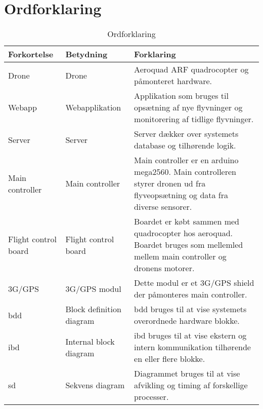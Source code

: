 \section{Ordforklaring}
\begin{table}[H]
	\centering
		\begin{tabular}{|p{2.6cm}|p{4.5 cm}|p{6.5 cm}|} 
		\hline
			\textbf{Forkortelse} & \textbf{Betydning} & \textbf{Forklaring} \\ \hline
			 Drone & Drone & Aeroquad ARF quadrocopter og \newline påmonteret hardware. \\ \hline
			 Webapp & Webapplikation & Applikation som bruges til opsætning af nye flyvninger og monitorering af tidlige flyvninger. \\ \hline
			 Server & Server & Server dækker over systemets database og tilhørende logik. \\ \hline
			 Main controller & Main controller  & Main controller er en arduino mega2560. Main controlleren styrer \newline dronen ud fra flyveopsætning og data fra diverse sensorer.   \\ \hline
			 Flight control \newline board & Flight control board  & Boardet er købt sammen med quadrocopter hos aeroquad. Boardet bruges som mellemled mellem main controller og dronens motorer.  \\ \hline
			 3G/GPS & 3G/GPS modul  & Dette modul er et 3G/GPS shield der påmonteres main controller.  \\ \hline
			 bdd& Block definition diagram  & bdd bruges til at vise systemets \newline overordnede hardware blokke.  \\ \hline
			 ibd& Internal block diagram & ibd bruges til at vise ekstern og intern kommunikation tilhørende en eller flere blokke. \\ \hline
			 sd& Sekvens diagram & Diagrammet bruges til at vise afvikling og timing af forskellige processer. \\ \hline			 
		\end{tabular}
	\caption{Ordforklaring}
\end{table}

\newpage
